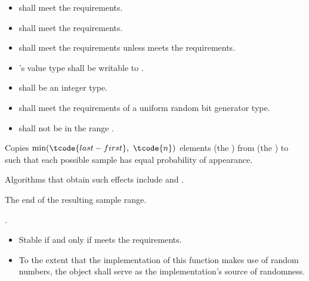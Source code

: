 \begin{itemdescr}
\pnum
\requires
\begin{itemize}
\item
   shall meet
  the  requirements.
\item
   shall meet
  the  requirements.
\item
   shall meet
  the  requirements
  unless  meets
  the  requirements.
\item
  's value type shall be
  writable to .
\item
   shall be an integer type.
\item
   shall meet
  the requirements of a uniform random bit generator type.
\item
   shall not be in the range .
\end{itemize}

\pnum
\effects
Copies $\min(\tcode{last - first}, \ \tcode{n})$ elements (the )
from  (the ) to 
such that each possible sample has equal probability of appearance.
\begin{note}
Algorithms that obtain such effects include 
and .
\end{note}

\pnum
\returns
The end of the resulting sample range.

\pnum
\complexity
{}.

\pnum
\remarks
\begin{itemize}
\item
  Stable if and only if  meets
  the  requirements.
\item
  To the extent that the implementation of this function makes use
  of random numbers, the object  shall serve as
  the implementation's source of randomness.
\end{itemize}
\end{itemdescr}

